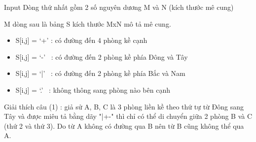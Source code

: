 Input
Dòng thứ nhất gồm 2 số nguyên dương M và N (kích thước mê cung)

M dòng sau là bảng S kích thước MxN mô tả mê cung.
\begin{itemize}
	\item S[i,j] = ‘+’ : có đường đến 4 phòng kề cạnh
	\item S[i,j] = ‘-’  : có đường đến 2 phòng kề phía Đông và Tây
	\item S[i,j] = ‘|’  : có đường đến 2 phòng kề phía Bắc và Nam
	\item S[i,j] = ‘.’  : không thông sang phòng nào bên cạnh
\end{itemize}

Giải thích câu (1) : giả sử A, B, C là 3 phòng liền kề theo thứ tự từ Đông sang Tây và được miêu tả bằng dãy "|+-" thì chỉ có thể di chuyển giữa 2 phòng B và C (thứ 2 và thứ 3). Do từ A không có đường qua B nên từ B cũng không thể qua A.